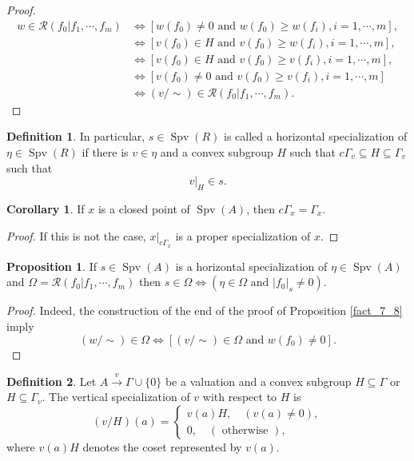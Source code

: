 \documentclass[10pt]{article}
\numberwithin{equation}{section}
\theoremstyle{definition}
\newtheorem{proposition}{Proposition}[subsection]
\newtheorem{definition}{Definition}[subsection]
\newtheorem{corollary}{Corollary} [subsection]
\DeclareMathOperator{\Spv}{Spv}
\newcommand{\cR}[0]{\mathcal{R}}
\newcommand{\ab}[1]{\vert #1 \vert}
\newcommand{\cGamma}[0]{c\Gamma}
\newcommand{\tand}[0]{\text{ and }}
\newcommand{\otherwise}[0]{\text{ otherwise }}
\begin{document}
\begin{proof}
    \begin{align*}
        w\in\cR(f_0|f_1,\cdots,f_m) &\iff [w(f_0)\not=0\text{ and } w(f_0)\geq w(f_i),i=1,\cdots,m],\\
        &\iff[v(f_0)\in H\text{ and }v(f_0)\geq w(f_i),i=1,\cdots,m],\\
        &\iff [v(f_0)\in H\tand v(f_0)\geq v(f_i),i=1,\cdots,m],\\
        &\iff [v(f_0)\not=0\tand v(f_0)\geq v(f_i),i=1,\cdots,m]\\
        &\iff (v/\sim)\in\cR(f_0|f_1,\cdots,f_m).
    \end{align*}
\end{proof}

\begin{definition}
    In particular, $s\in\Spv(R)$ is called a horizontal specialization of $\eta\in \Spv(R)$ if there is $v\in \eta$ and a convex subgroup $H$ such that $\cGamma_v\subseteq H\subseteq\Gamma_v$ such that
    \begin{equation*}
        v|_H \in s.
    \end{equation*}
\end{definition}

\begin{corollary}
    \label{fact_7_9}
    If $x$ is a closed point of $\Spv(A)$, then $\cGamma_x=\Gamma_x$.
\end{corollary}
\begin{proof}
    If this is not the case, $x|_{\cGamma_x}$ is a proper specialization of $x$.
\end{proof}

\begin{proposition}
    \label{fact_7_10}
    If $s\in\Spv(A)$ is a horizontal specialization of $\eta\in\Spv(A)$ and $\Omega=\cR(f_0|f_1,\cdots,f_m)$ then $s\in\Omega\iff(\eta\in\Omega\tand\ab{f_0}_s\not=0)$.
\end{proposition}

\begin{proof}
    Indeed, the construction of the end of the proof of Proposition \ref{fact_7_8} imply
    \begin{equation*}
        (w/\sim)\in\Omega\iff[(v/\sim)\in\Omega\tand w(f_0)\not=0].
    \end{equation*}
\end{proof}

\begin{definition}
    Let $A\stackrel{v}{\to}\Gamma\cup\{0\}$ be a valuation and a convex subgroup $H\subseteq \Gamma$ or $H\subseteq\Gamma_v$. The vertical specialization of $v$ with respect to $H$ is
    \begin{equation*}
        (v/H)(a)=\begin{cases}
            v(a)H, \quad(v(a)\not=0),\\
            0,\quad(\otherwise),
        \end{cases}
    \end{equation*}
    where $v(a)H$ denotes the coset represented by $v(a)$.
\end{definition}
\end{document}
